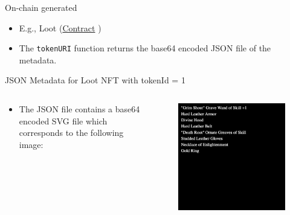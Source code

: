 \documentclass[handout]{beamer}
\begin{document}
\begin{frame}{On-chain generated}
	\begin{itemize}
		\item E.g., Loot (\href{https://etherscan.io/address/0xff9c1b15b16263c61d017ee9f65c50e4ae0113d7}{Contract} \link )
		\item The \texttt{tokenURI} function returns the base64 encoded JSON file of the metadata. 
	\end{itemize}
\begin{samplecode}{JSON Metadata for Loot NFT with tokenId {=} 1}
		
	\end{samplecode}
	\begin{columns}[T]
		\begin{column}{0.6\textwidth}
		\begin{itemize}
		\item The JSON file contains a base64 encoded SVG file which corresponds to the following image:
	\end{itemize}
		\end{column}
		\begin{column}{0.4\textwidth}
			\begin{figure}
				\vspace{-1em}
				\centering
				\includegraphics[scale=0.16]{../assets/images/loot1.png}
				\caption*{}	
		\end{figure}
		\end{column}
	\end{columns}
\end{frame}
\end{document}

